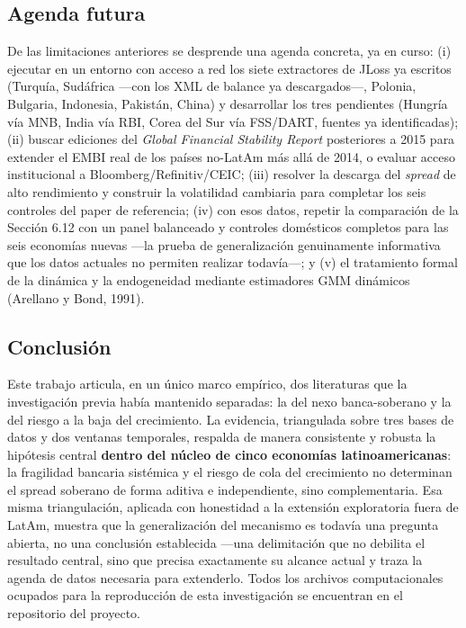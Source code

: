 \documentclass[5p,times,twocolumn,authoryear]{elsarticle}
\begin{document}
\subsection{Agenda futura}

De las limitaciones anteriores se desprende una agenda concreta, ya en curso: (i) ejecutar en un entorno con acceso a red los siete extractores de JLoss ya escritos (Turquía, Sudáfrica —con los XML de balance ya descargados—, Polonia, Bulgaria, Indonesia, Pakistán, China) y desarrollar los tres pendientes (Hungría vía MNB, India vía RBI, Corea del Sur vía FSS/DART, fuentes ya identificadas); (ii) buscar ediciones del \textit{Global Financial Stability Report} posteriores a 2015 para extender el EMBI real de los países no-LatAm más allá de 2014, o evaluar acceso institucional a Bloomberg/Refinitiv/CEIC; (iii) resolver la descarga del \textit{spread} de alto rendimiento y construir la volatilidad cambiaria para completar los seis controles del paper de referencia; (iv) con esos datos, repetir la comparación de la Sección 6.12 con un panel balanceado y controles domésticos completos para las seis economías nuevas —la prueba de generalización genuinamente informativa que los datos actuales no permiten realizar todavía—; y (v) el tratamiento formal de la dinámica y la endogeneidad mediante estimadores GMM dinámicos (Arellano y Bond, 1991).

\subsection{Conclusión}

Este trabajo articula, en un único marco empírico, dos literaturas que la investigación previa había mantenido separadas: la del nexo banca-soberano y la del riesgo a la baja del crecimiento. La evidencia, triangulada sobre tres bases de datos y dos ventanas temporales, respalda de manera consistente y robusta la hipótesis central \textbf{dentro del núcleo de cinco economías latinoamericanas}: la fragilidad bancaria sistémica y el riesgo de cola del crecimiento no determinan el spread soberano de forma aditiva e independiente, sino complementaria. Esa misma triangulación, aplicada con honestidad a la extensión exploratoria fuera de LatAm, muestra que la generalización del mecanismo es todavía una pregunta abierta, no una conclusión establecida —una delimitación que no debilita el resultado central, sino que precisa exactamente su alcance actual y traza la agenda de datos necesaria para extenderlo. Todos los archivos computacionales ocupados para la reproducción de esta investigación se encuentran en el repositorio del proyecto.
\end{document}
